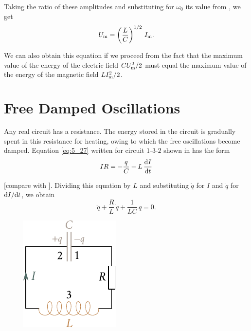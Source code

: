 \noindent
Taking the ratio of these amplitudes and substituting for $\omega_0$ its value from , we get
\begin{equation}\label{eq:13_9}
    U_{\text{m}} = \left(\frac{L}{C}\right)^{1/2}\, I_{\text{m}}.
\end{equation}

\noindent
We can also obtain this equation if we proceed from the fact that the maximum value of the energy of the electric field $CU_{\text{m}}^2/2$ must equal the maximum value of the energy of the magnetic field $LI_{\text{m}}^2/2$.

\section{Free Damped Oscillations}\label{sec:13_3}

Any real circuit has a resistance.
The energy stored in the circuit is gradually spent in this resistance for heating, owing to which the free oscillations become damped.
Equation \eqref{eq:5_27} written for circuit $1$-$3$-$2$ shown in  has the form
\begin{equation}\label{eq:13_10}
    IR = - \frac{q}{C} - L\, \dfrac{\mathrm{d} I}{\mathrm{d} t}
\end{equation}

[compare with ].
Dividing this equation by $L$ and substituting $\dot{q}$ for $I$ and $\ddot{q}$ for $\mathrm{d} I/\mathrm{d} t$, we obtain
\begin{equation}\label{eq:13_11}
    \ddot{q} + \frac{R}{L}\, \dot{q} + \frac{1}{LC}\, q = 0.
\end{equation}

\begin{figure}[t]
	\begin{center}
		\includegraphics[scale=1]{figures/ch_13/fig_13_3.pdf}
		\caption[]{}
		\label{fig:13_3}
	\end{center}
	\vspace{-0.8cm}
\end{figure}

